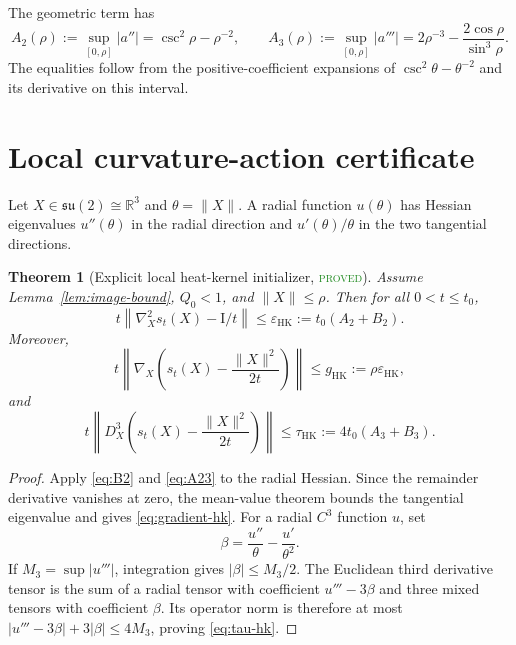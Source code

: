 \documentclass[11pt]{article}
\newtheorem{theorem}{Theorem}[section]
\theoremstyle{definition}
\newcommand{\R}{\mathbb R}
\newcommand{\Id}{\mathrm I}
\newcommand{\statusproved}{\textcolor{ForestGreen}{\textsc{proved}}}
\begin{document}
The geometric term has
\begin{equation}\label{eq:A23}
 A_2(\rho):=\sup_{[0,\rho]}|a''|
 =\csc^2\rho-\rho^{-2},
 \qquad
 A_3(\rho):=\sup_{[0,\rho]}|a'''|
 =2\rho^{-3}-\frac{2\cos\rho}{\sin^3\rho}.
\end{equation}
The equalities follow from the positive-coefficient expansions of
$\csc^2\theta-\theta^{-2}$ and its derivative on this interval.

\section{Local curvature-action certificate}

Let $X\in\mathfrak{su}(2)\cong\R^3$ and $\theta=\|X\|$.  A radial function
$u(\theta)$ has Hessian eigenvalues $u''(\theta)$ in the radial direction and
$u'(\theta)/\theta$ in the two tangential directions.

\begin{theorem}[Explicit local heat-kernel initializer, \statusproved]
\label{thm:initializer}
Assume Lemma~\ref{lem:image-bound}, $Q_0<1$, and $\|X\|\le\rho$.  Then for all
$0<t\le t_0$,
\begin{equation}\label{eq:epsilon-hk}
 t\left\|\nabla_X^2s_t(X)-\Id/t\right\|
 \le \varepsilon_{\mathrm{HK}}
 :=t_0(A_2+B_2).
\end{equation}
Moreover,
\begin{equation}\label{eq:gradient-hk}
 t\left\|\nabla_X\left(s_t(X)-\frac{\|X\|^2}{2t}\right)\right\|
 \le g_{\mathrm{HK}}:=\rho\varepsilon_{\mathrm{HK}},
\end{equation}
and
\begin{equation}\label{eq:tau-hk}
 t\left\|D_X^3\left(s_t(X)-\frac{\|X\|^2}{2t}\right)\right\|
 \le\tau_{\mathrm{HK}}:=4t_0(A_3+B_3).
\end{equation}
\end{theorem}
\begin{proof}
Apply \eqref{eq:B2} and \eqref{eq:A23} to the radial Hessian.  Since the
remainder derivative vanishes at zero, the mean-value theorem bounds the
tangential eigenvalue and gives \eqref{eq:gradient-hk}.  For a radial $C^3$
function $u$, set
\[
 \beta=\frac{u''}{\theta}-\frac{u'}{\theta^2}.
\]
If $M_3=\sup|u'''|$, integration gives $|\beta|\le M_3/2$.  The Euclidean
third derivative tensor is the sum of a radial tensor with coefficient
$u'''-3\beta$ and three mixed tensors with coefficient $\beta$.  Its operator
norm is therefore at most $|u'''-3\beta|+3|\beta|\le4M_3$, proving
\eqref{eq:tau-hk}.
\end{proof}
\end{document}

